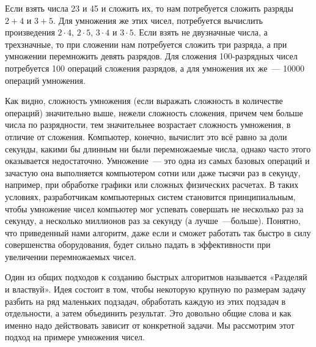 Если взять числа 23 и 45 и сложить их, то нам потребуется сложить разряды $2+4$ и $3+5$. Для умножения же этих чисел, потребуется вычислить произведения $2\cdot 4$, $2\cdot 5$, $3\cdot 4$ и $3\cdot 5$. Если взять не двузначные числа, а трехзначные, то при сложении нам потребуется сложить три разряда, а при умножении перемножить девять разрядов. Для сложения 100-разрядных чисел потребуется 100 операций сложения разрядов, а для умножения их же~— 10000 операций умножения.

Как видно, сложность умножения (если выражать сложность в количестве операций)  значительно выше, нежели сложность сложения, причем чем больше числа по разрядности, тем значительнее возрастает сложность умножения, в отличие от сложения. Компьютер, конечно, вычислит это всё равно за доли секунды, какими бы длинным ни были перемножаемые числа, однако часто этого оказывается недостаточно. Умножение~— это одна из самых базовых операций и зачастую она выполняется компьютером сотни или даже тысячи раз в секунду, например, при обработке графики или сложных физических расчетах. В таких условиях, разработчикам компьютерных систем становится принципиальным, чтобы умножение чисел компьютер мог успевать совершать не несколько раз за секунду, а несколько миллионов раз за секунду (а лучше~---больше). Понятно, что приведенный нами алгоритм, даже если и сможет работать так быстро в силу совершенства оборудования, будет сильно падать в эффективности при увеличении перемножаемых чисел.

Один из общих подходов к созданию быстрых алгоритмов называется «Разделяй и властвуй». Идея состоит в том, чтобы некоторую крупную по размерам задачу разбить на ряд маленьких подзадач, обработать каждую из этих подзадач в отдельности, а затем объединить результат. Это довольно общие слова и как именно надо действовать зависит от конкретной задачи. Мы рассмотрим этот подход на примере умножения чисел.

